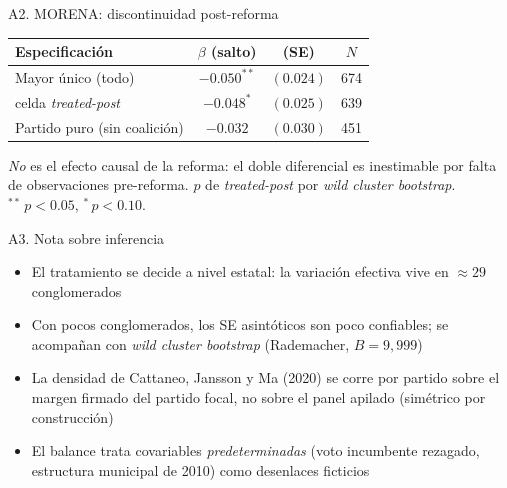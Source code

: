 \documentclass[
  aspectratio=43,        %
  t,                     %
  10pt                   %
]{beamer}
\begin{document}
\begin{frame}[noframenumbering]{A2. MORENA: discontinuidad post-reforma}

  \begin{table}\centering\small
    \begin{tabular}{lccc}
      \toprule
      Especificación & $\beta$ (salto) & (SE) & $N$ \\
      \midrule
      Mayor único (todo)              & $-0.050^{**}$ & $(0.024)$ & 674 \\
      \quad celda \emph{treated-post} & $-0.048^{*}$  & $(0.025)$ & 639 \\
      Partido puro (sin coalición)    & $-0.032$      & $(0.030)$ & 451 \\
      \bottomrule
    \end{tabular}
  \end{table}

  \vspace{0.3em}
  {\footnotesize \textcolor{ITAMgray}{%
    \textit{No} es el efecto causal de la reforma: el doble diferencial es
    inestimable por falta de observaciones pre-reforma. $p$ de \emph{treated-post}
    por \emph{wild cluster bootstrap}. $^{**}\,p<0.05$, $^{*}\,p<0.10$.}}

\end{frame}

\begin{frame}[noframenumbering]{A3. Nota sobre inferencia}

  \begin{itemize}
    \item El tratamiento se decide a nivel estatal: la variación efectiva vive
          en $\approx 29$ conglomerados
    \item Con pocos conglomerados, los SE asintóticos son poco confiables; se
          acompañan con \emph{wild cluster bootstrap} (Rademacher, $B = 9{,}999$)
    \item La densidad de Cattaneo, Jansson y Ma (2020) se corre por partido sobre
          el margen firmado del partido focal, no sobre el panel apilado
          (simétrico por construcción)
    \item El balance trata covariables \emph{predeterminadas} (voto incumbente
          rezagado, estructura municipal de 2010) como desenlaces ficticios
  \end{itemize}

\end{frame}
\end{document}
